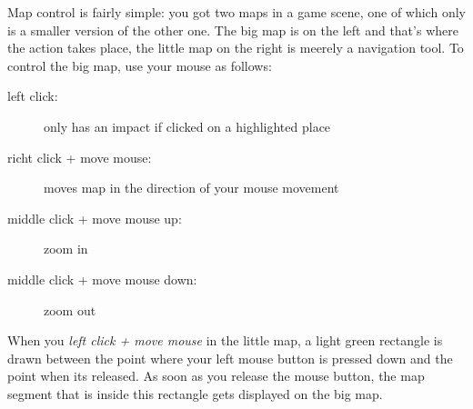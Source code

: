 Map control is fairly simple: you got two maps in a game scene, one of which only is a smaller version of the other one. The big map is on the left and that's where the action takes place, the little map on the right is meerely a navigation tool. To control the big map, use your mouse as follows:

  \begin{description}
    \item[left click:] only has an impact if clicked on a highlighted place
    \item[richt click + move mouse:] moves map in the direction of your mouse movement
    \item[middle click + move mouse up:] zoom in
    \item[middle click + move mouse down:] zoom out
  \end{description}

  When you \emph{left click + move mouse} in the little map, a light green rectangle is drawn between the point where your left mouse button is pressed down and the point when its released. As soon as you release the mouse button, the map segment that is inside this rectangle gets displayed on the big map.
